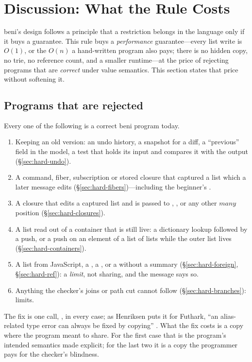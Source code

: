 \section{Discussion: What the Rule Costs}
\label{sec:discussion}

beni's design follows a principle that a restriction belongs in the language only if it buys a
guarantee. This rule buys a \emph{performance} guarantee---every list write is $O(1)$, or the $O(n)$ a
hand-written program also pays; there is no hidden copy, no trie, no reference count, and a smaller
runtime---at the price of rejecting programs that are \emph{correct} under value semantics. This section
states that price without softening it.

\subsection{Programs that are rejected}

Every one of the following is a correct beni program today.
\begin{enumerate}
\item Keeping an old version: an undo history, a snapshot for a diff, a ``previous'' field in the model,
a test that holds its input and compares it with the output (\S\ref{sec:hard-undo}).
\item A command, fiber, subscription or stored closure that captured a list which a later message edits
(\S\ref{sec:hard-fibers})---including the beginner's .
\item A closure that edits a captured list and is passed to , ,  or any
other $\mathit{many}$ position (\S\ref{sec:hard-closures}).
\item A list read out of a container that is still live: a dictionary lookup followed by a push, or a
push on an element of a list of lists while the outer list lives (\S\ref{sec:hard-containers}).
\item A list from JavaScript, a , a , or a  without a summary
(\S\ref{sec:hard-foreign}, \S\ref{sec:hard-ref}): a \emph{limit}, not sharing, and the message says so.
\item Anything the checker's joins or path cut cannot follow (\S\ref{sec:hard-branches}): limits.
\end{enumerate}
The fix is one call, , in every case; as Henriksen puts it for Futhark, ``an
alias-related type error can always be fixed by copying'' \citep{henriksen2022uniqueness}. What the fix
costs is a copy where the program meant to share. For the first case that is the program's intended
semantics made explicit; for the last two it is a copy the programmer pays for the checker's blindness.

